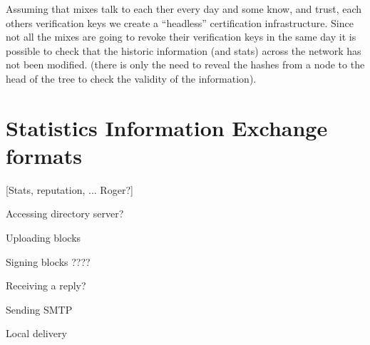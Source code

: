 Assuming that mixes talk to each ther every day and some know, and
trust, each others verification keys we create a ``headless''
certification infrastructure. Since not all the mixes are going to
revoke their verification keys in the same day it is possible to 
check that the historic information (and stats) across the network has
not been modified. (there is only the need to reveal the hashes from a
node to the head of the tree to check the validity of the information).

\section{Statistics Information Exchange formats}

[Stats, reputation, ... Roger?]

Accessing directory server?

Uploading blocks

Signing blocks ????

Receiving a reply?

Sending SMTP

Local delivery

